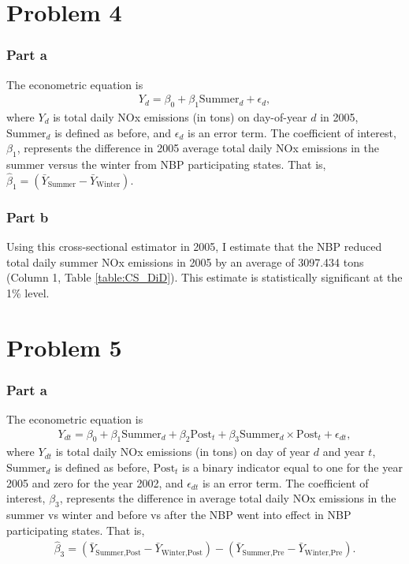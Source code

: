 \documentclass[12pt]{article}
\begin{document}
\section*{Problem 4}

\subsubsection*{Part a}
The econometric equation is
\begin{align}
	Y_d = \beta_0 + \beta_1 \text{Summer}_d + \epsilon_d,
\end{align}
where $Y_{d}$ is total daily NOx emissions (in tons) on day-of-year $d$ in 2005, $\text{Summer}_d$ is defined as before, and $\epsilon_d$ is an error term. The coefficient of interest, $\beta_1$, represents the difference in 2005 average total daily NOx emissions in the summer versus the winter from NBP participating states. That is, $\hat{\beta}_1 = (\bar{Y}_{\text{Summer}} - \bar{Y}_{\text{Winter}})$.

\subsubsection*{Part b}
Using this cross-sectional estimator in 2005, I estimate that the NBP reduced total daily summer NOx emissions in 2005 by an average of 3097.434 tons (Column 1, Table \ref{table:CS_DiD}). This estimate is statistically significant at the 1\% level.

\section*{Problem 5}

\subsubsection*{Part a}
The econometric equation is
\begin{align}
	Y_{dt} = \beta_0 + \beta_1 \text{Summer}_d + \beta _2\text{Post}_t + \beta_3 \text{Summer}_d \times \text{Post}_t + \epsilon_{dt},
\end{align}
where $Y_{dt}$ is total daily NOx emissions (in tons) on day of year $d$ and year $t$, $\text{Summer}_d$ is defined as before, $\text{Post}_t$ is a binary indicator equal to one for the year 2005 and zero for the year 2002, and $\epsilon_{dt}$ is an error term. The coefficient of interest, $\beta_3$, represents the difference in average total daily NOx emissions in the summer vs winter and before vs after the NBP went into effect in NBP participating states. That is, 
\begin{align*}
	\hat{\beta}_3 = (\bar{Y}_{\text{Summer}, \text{Post}} -  \bar{Y}_{\text{Winter}, \text{Post}}) - (\bar{Y}_{\text{Summer}, \text{Pre}} - \bar{Y}_{\text{Winter}, \text{Pre}}).
\end{align*}
\end{document}
